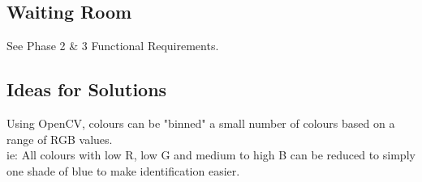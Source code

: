 \documentclass{article}
\begin{document}
\subsection{Waiting Room}
See Phase 2 \& 3 Functional Requirements.

\subsection{Ideas for Solutions}
Using OpenCV, colours can be "binned" a small number of colours based on a range of RGB values. \\ 
ie: All colours with low R, low G and medium to high B can be reduced to simply one shade of blue to make identification easier. \\
\end{document}
